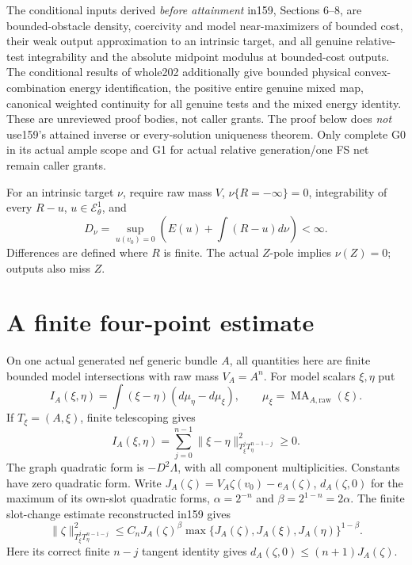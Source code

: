 \documentclass[11pt]{article}
\newcommand{\MA}{\operatorname{MA}}
\newcommand{\EE}{\mathcal E^1_\theta}
\begin{document}
The conditional inputs derived \emph{before attainment} in159,
Sections 6--8, are bounded-obstacle density, coercivity and model
near-maximizers of bounded cost, their weak output approximation
to an intrinsic target, and all genuine relative-test integrability
and the absolute midpoint modulus at bounded-cost outputs.
The conditional results of whole202 additionally give bounded
physical convex-combination energy identification, the positive
entire genuine mixed map, canonical weighted continuity for all
genuine tests and the mixed energy identity.
These are unreviewed proof bodies, not caller grants.
The proof below does \emph{not} use159's attained inverse or
every-solution uniqueness theorem.
Only complete G0 in its actual ample scope and G1 for actual relative
generation/one FS net remain caller grants.

For an intrinsic target $\nu$, require raw mass $V$,
$\nu\{R=-\infty\}=0$, integrability of every $R-u$, $u\in\EE$,
and
\[
 D_\nu=\sup_{u(v_0)=0}\left(E(u)+\int(R-u)d\nu\right)<\infty.
                                                        \tag{1}
\]
Differences are defined where $R$ is finite. The actual $Z$-pole
implies $\nu(Z)=0$; outputs also miss $Z$.

\section{A finite four-point estimate}
On one actual generated nef generic bundle $A$, all quantities
here are finite bounded model intersections with raw mass $V_A=A^n$.
For model scalars $\xi,\eta$ put
\[
 I_A(\xi,\eta)=\int(\xi-\eta)(d\mu_\eta-d\mu_\xi),
 \qquad \mu_\xi=\MA_{A,\mathrm{raw}}(\xi).
                                                        \tag{2}
\]
If $T_\xi=(A,\xi)$, finite telescoping gives
\[
 I_A(\xi,\eta)=\sum_{j=0}^{n-1}
   \|\xi-\eta\|_{T_\xi^jT_\eta^{n-1-j}}^2\geq0.          \tag{3}
\]
The graph quadratic form is $-D^2\Lambda$, with all component
multiplicities. Constants have zero quadratic form.
Write $J_A(\zeta)=V_A\zeta(v_0)-e_A(\zeta)$,
$d_A(\zeta,0)$ for the maximum of its own-slot quadratic forms,
$\alpha=2^{-n}$ and $\beta=2^{1-n}=2\alpha$.
The finite slot-change estimate reconstructed in159 gives
\[
 \|\zeta\|_{T_\xi^jT_\eta^{n-1-j}}^2
 \leq C_n J_A(\zeta)^\beta
     \max\{J_A(\zeta),J_A(\xi),J_A(\eta)\}^{1-\beta}.
                                                        \tag{4}
\]
Here its correct finite $n-j$ tangent identity gives
$d_A(\zeta,0)\leq(n+1)J_A(\zeta)$.
\end{document}
